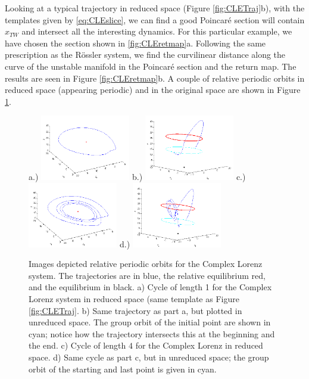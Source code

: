 \documentclass[12 pt]{article}
\begin{document}
Looking at a typical trajectory in reduced space (Figure \ref{fig:CLETraj}b), with the templates given by \ref{eq:CLEslice}, we can find a good Poincar\'e section will contain $x_{TW}$ and intersect all the interesting dynamics. For this particular example, we have chosen the section shown in \ref{fig:CLEretmap}a.  Following the same prescription as the R\"ossler system, we find the curvilinear distance along the curve of the unstable manifold in the Poincar\'e section and the return map.  The results are seen in Figure \ref{fig:CLEretmap}b.  A couple of relative periodic orbits in reduced space (appearing periodic) and in the original space are shown in Figure \ref{fig:CLEPO}.
 \begin{figure}
\centering
a.)  \includegraphics[width=0.35\textwidth]{Figs/Section3/kc1cyclec.png}
b.)
  \includegraphics[width=0.35\textwidth]{Figs/Section3/kc1cycleunredc.png}
c.)
  \includegraphics[width=0.35\textwidth]{Figs/Section3/kc4cyclec.png}
d.)
  \includegraphics[width=0.35\textwidth]{Figs/Section3/kc4cyclewithcirclec.png}
\caption{Images depicted relative periodic orbits for the Complex Lorenz system.  The trajectories are in blue, the relative equilibrium red, and the equilibrium in black.
a) Cycle of length 1 for the Complex Lorenz system in reduced space (same template as Figure \ref{fig:CLETraj}. b) Same trajectory as part a, but plotted in unreduced space.  The group orbit of the initial point are shown in cyan; notice how the trajectory intersects this at the beginning and the end. c) Cycle of length $4$ for the Complex Lorenz in reduced space. d) Same cycle as part c, but in unreduced space; the group orbit of the starting and last point is given in cyan. }
 \label{fig:CLEPO}
\end{figure}
\end{document}
